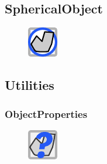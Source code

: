 \documentclass{ol-softwaremanual}
\begin{document}
\subsection{SphericalObject}
\begin{figure}[h]
    \centering
    \includegraphics[width = .5\textwidth]{figures/Icons/SPHERICALOBJECT.pdf}
\end{figure}

\subsection{Utilities}

\subsubsection{ObjectProperties}
\begin{figure}[h]
    \centering
    \includegraphics[width = .5\textwidth]{figures/Icons/OBJECTPROPERTIES.pdf}
\end{figure}
\end{document}
